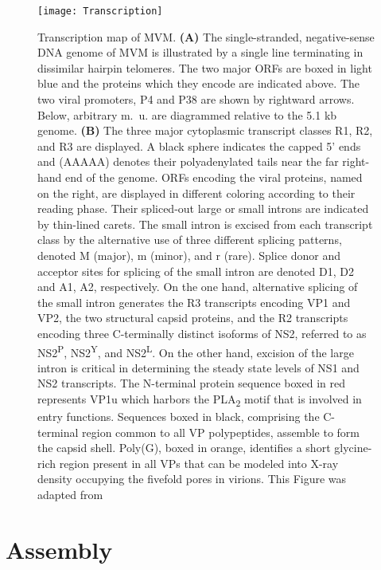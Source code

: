 \begin{figure}[H]
\centering
  \texttt{[image: Transcription]}
  \caption[Transcription map of MVM]
   {Transcription map of MVM. \textbf{(A)} The single-stranded, negative-sense DNA genome of MVM is illustrated by a single line terminating in dissimilar hairpin telomeres. The two major ORFs are boxed in light blue and the proteins which they encode are indicated above. The two viral promoters, P4 and P38 are shown by rightward arrows. Below, arbitrary m.~u. are diagrammed relative to the 5.1 kb genome. \textbf{(B)} The three major cytoplasmic transcript classes R1, R2, and R3 are displayed. A black sphere indicates the capped 5’ ends and (AAAAA) denotes their polyadenylated tails near the far right-hand end of the genome. ORFs encoding the viral proteins, named on the right, are displayed in different coloring according to their reading phase. Their spliced-out large or small introns are indicated by thin-lined carets. The small intron is excised from each transcript class by the alternative use of three different splicing patterns, denoted M (major), m (minor), and r (rare). Splice donor and acceptor sites for splicing of the small intron are denoted D1, D2 and A1, A2, respectively. On the one hand, alternative splicing of the small intron generates the R3 transcripts encoding VP1 and VP2, the two structural capsid proteins, and the R2 transcripts encoding three C-terminally distinct isoforms of NS2, referred to as NS2\textsuperscript{P}, NS2\textsuperscript{Y}, and NS2\textsuperscript{L}. On the other hand, excision of the large intron is critical in determining the steady state levels of NS1 and NS2 transcripts. The N-terminal protein sequence boxed in red represents VP1u which harbors the PLA\textsubscript{2} motif that is involved in entry functions. Sequences boxed in black, comprising the C-terminal region common to all VP polypeptides, assemble to form the capsid shell. Poly(G), boxed in orange, identifies a short glycine-rich region present in all VPs that can be modeled into X-ray density occupying the fivefold pores in virions. This Figure was adapted from \cite{small}}
\label{Transcription}
\end{figure}       




\section{Assembly}
\label{Assembly}

